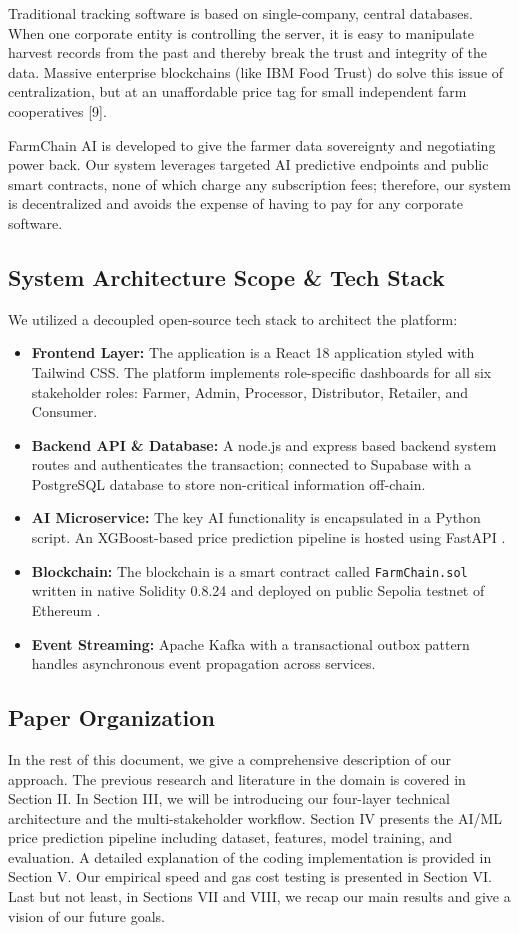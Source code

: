 \documentclass[conference]{IEEEtran}
\begin{document}
Traditional tracking software is based on single-company, central databases. When one corporate entity is controlling the server, it is easy to manipulate harvest records from the past and thereby break the trust and integrity of the data. Massive enterprise blockchains (like IBM Food Trust) do solve this issue of centralization, but at an unaffordable price tag for small independent farm cooperatives [9].

FarmChain AI is developed to give the farmer data sovereignty and negotiating power back. Our system leverages targeted AI predictive endpoints and public smart contracts, none of which charge any subscription fees; therefore, our system is decentralized and avoids the expense of having to pay for any corporate software.

\subsection{System Architecture Scope \& Tech Stack}
We utilized a decoupled open-source tech stack to architect the platform:
\begin{itemize}
    \item \textbf{Frontend Layer:} The application is a React 18 application styled with Tailwind CSS. The platform implements role-specific dashboards for all six stakeholder roles: Farmer, Admin, Processor, Distributor, Retailer, and Consumer.
    \item \textbf{Backend API \& Database:} A node.js and express based backend system routes and authenticates the transaction; connected to Supabase with a PostgreSQL database to store non-critical information off-chain.
    \item \textbf{AI Microservice:} The key AI functionality is encapsulated in a Python script. An XGBoost-based price prediction pipeline is hosted using FastAPI \cite{dragoni2017microservices}.
    \item \textbf{Blockchain:} The blockchain is a smart contract called \texttt{FarmChain.sol} written in native Solidity 0.8.24 and deployed on public Sepolia testnet of Ethereum \cite{wood2014ethereum}.
    \item \textbf{Event Streaming:} Apache Kafka with a transactional outbox pattern handles asynchronous event propagation across services.
\end{itemize}

\subsection{Paper Organization}
In the rest of this document, we give a comprehensive description of our approach. The previous research and literature in the domain is covered in Section II. In Section III, we will be introducing our four-layer technical architecture and the multi-stakeholder workflow. Section IV presents the AI/ML price prediction pipeline including dataset, features, model training, and evaluation. A detailed explanation of the coding implementation is provided in Section V. Our empirical speed and gas cost testing is presented in Section VI. Last but not least, in Sections VII and VIII, we recap our main results and give a vision of our future goals.
\end{document}
